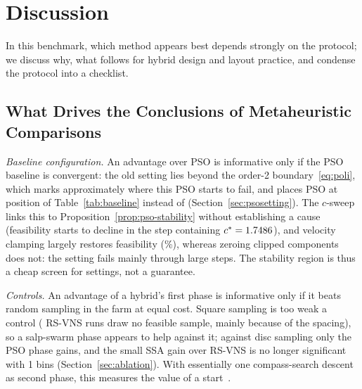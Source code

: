 \section{Discussion}
\label{sec:discussion}
In this benchmark, which method appears best depends strongly on the protocol; we discuss why, what follows for hybrid design and layout practice, and condense the protocol into a checklist.

\subsection{What Drives the Conclusions of Metaheuristic Comparisons}
\label{sec:disc-drivers}
\emph{Baseline configuration.} An advantage over PSO is informative only if the PSO baseline is convergent: the old setting lies beyond the order-2 boundary~\eqref{eq:poli}, which marks approximately where this PSO starts to fail, and places PSO at position \NBaseOldPSOPos{} of Table~\ref{tab:baseline} instead of \NBaseNewPSOPos{} (Section~\ref{sec:psosetting}). The $c$-sweep links this to Proposition~\ref{prop:pso-stability} without establishing a cause (feasibility starts to decline in the step containing $c^\ast=1.7486$), and velocity clamping largely restores feasibility (\NSFeasVMax\%), whereas zeroing clipped components does not: the setting fails mainly through large steps. The stability region is thus a cheap screen for settings, not a guarantee.

\emph{Controls.} An advantage of a hybrid's first phase is informative only if it beats random sampling in the farm at equal cost. Square sampling is too weak a control (\NRSRunsNoFeasSample{} RS-VNS runs draw no feasible sample, mainly because of the spacing), so a salp-swarm phase appears to help against it; against disc sampling only the PSO phase gains, and the small SSA gain over RS-VNS is no longer significant with 1\textdegree{} bins (Section~\ref{sec:ablation}). With essentially one compass-search descent as second phase, this measures the value of a start~\cite{Feng2015}.

